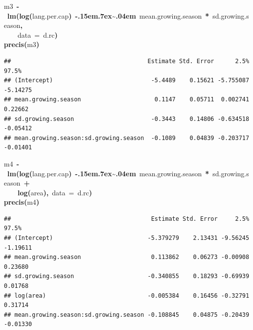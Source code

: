 \documentclass{article}
\makeatletter
\newcommand{\hlfunctioncall}[1]{\textcolor[rgb]{.5,0,.33}{\textbf{#1}}}%
\newcommand{\hlkeyword}[1]{\textbf{#1}}%
\newcommand{\hlargument}[1]{\textcolor[rgb]{.69,.25,.02}{#1}}%
\newcommand{\hlassignement}[1]{\textbf{#1}}%
\newcommand{\hlsymbol}[1]{#1}%
\def\urltilda{\kern -.15em\lower .7ex\hbox{\~{}}\kern .04em}%
\newcommand{\hlstd}[1]{\textcolor[rgb]{0,0,0}{#1}}%
\newenvironment{kframe}{%
 \def\FrameCommand##1{\hskip\@totalleftmargin \hskip-\fboxsep
 \colorbox{shadecolor}{##1}\hskip-\fboxsep
     \hskip-\linewidth \hskip-\@totalleftmargin \hskip\columnwidth}%
 \MakeFramed {\advance\hsize-\width
   \@totalleftmargin\z@ \linewidth\hsize
   \@setminipage}}%
 {\par\unskip\endMakeFramed}
\newenvironment{knitrout}{}{} %
\makeatother
\begin{document}
\begin{knitrout}
{\begin{kframe}
\begin{flushleft}
\ttfamily\noindent
\hlsymbol{m3}{\ }\hlassignement{\usebox{\hlnormalsizeboxlessthan}-}{\ }\hlfunctioncall{lm}\hlkeyword{(}\hlfunctioncall{log}\hlkeyword{(}\hlsymbol{lang.per.cap}\hlkeyword{)}{\ }\hlkeyword{\urltilda{}}{\ }\hlsymbol{mean.growing.season}{\ }\hlkeyword{*}{\ }\hlsymbol{sd.growing.season}\hlkeyword{,}\hspace*{\fill}\\
\hlstd{}{\ }{\ }{\ }{\ }\hlargument{data}{\ }\hlargument{=}{\ }\hlsymbol{d.rc}\hlkeyword{)}\hspace*{\fill}\\
\hlstd{}\hlfunctioncall{precis}\hlkeyword{(}\hlsymbol{m3}\hlkeyword{)}\mbox{}
\normalfont
\end{flushleft}
\begin{verbatim}
##                                       Estimate Std. Error      2.5%    97.5%
## (Intercept)                            -5.4489    0.15621 -5.755087 -5.14275
## mean.growing.season                     0.1147    0.05711  0.002741  0.22662
## sd.growing.season                      -0.3443    0.14806 -0.634518 -0.05412
## mean.growing.season:sd.growing.season  -0.1089    0.04839 -0.203717 -0.01401
\end{verbatim}
\begin{flushleft}
\ttfamily\noindent
\hlsymbol{m4}{\ }\hlassignement{\usebox{\hlnormalsizeboxlessthan}-}{\ }\hlfunctioncall{lm}\hlkeyword{(}\hlfunctioncall{log}\hlkeyword{(}\hlsymbol{lang.per.cap}\hlkeyword{)}{\ }\hlkeyword{\urltilda{}}{\ }\hlsymbol{mean.growing.season}{\ }\hlkeyword{*}{\ }\hlsymbol{sd.growing.season}{\ }\hlkeyword{+}\hspace*{\fill}\\
\hlstd{}{\ }{\ }{\ }{\ }\hlfunctioncall{log}\hlkeyword{(}\hlsymbol{area}\hlkeyword{)}\hlkeyword{,}{\ }\hlargument{data}{\ }\hlargument{=}{\ }\hlsymbol{d.rc}\hlkeyword{)}\hspace*{\fill}\\
\hlstd{}\hlfunctioncall{precis}\hlkeyword{(}\hlsymbol{m4}\hlkeyword{)}\mbox{}
\normalfont
\end{flushleft}
\begin{verbatim}
##                                        Estimate Std. Error     2.5%    97.5%
## (Intercept)                           -5.379279    2.13431 -9.56245 -1.19611
## mean.growing.season                    0.113862    0.06273 -0.00908  0.23680
## sd.growing.season                     -0.340855    0.18293 -0.69939  0.01768
## log(area)                             -0.005384    0.16456 -0.32791  0.31714
## mean.growing.season:sd.growing.season -0.108845    0.04875 -0.20439 -0.01330
\end{verbatim}
\end{kframe}}
\end{knitrout}
\end{document}
